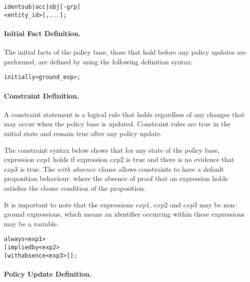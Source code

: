 \documentclass[glov2,twocolumn,final]{svjour2}
\newenvironment{vverbatim}
  {\begin{alltt}}
  {\vspace{-\baselineskip}\end{alltt}}
\begin{document}
          \begin{vverbatim}
  ident sub|acc|obj[-grp]
    <entity\_id>[, ...];
          \end{vverbatim}

        \paragraph{Initial Fact Definition.}

          The initial facts of the policy base, those that hold before any
          policy updates are performed, are defined by using the following
          definition syntax:

          \begin{vverbatim}
  initially <ground\_exp>;
          \end{vverbatim}

        \paragraph{Constraint Definition.}

          A constraint statement is a logical rule that holds regardless of any
          changes that may occur when the policy base is updated. Constraint
          rules are true in the initial state and remain true after any policy
          update.

          The constraint syntax below shows that for any state of the policy
          base, expression $exp1$ holds if expression $exp2$ is true and there
          is no evidence that $exp3$ is true. The $with$ $absence$ clause
          allows constraints to have a default proposition behaviour, where
          the absence of proof that an expression holds  satisfies the clause
          condition of the proposition.

          It is important to note that the expressions $exp1$, $exp2$ and
          $exp3$ may be non-ground expressions, which means an identifier
          occurring within these expressions may be a variable.

          \begin{vverbatim}
  always <exp1>
    [implied by <exp2>
    [with absence <exp3>]];
          \end{vverbatim}

        \paragraph{Policy Update Definition.}
\end{document}
